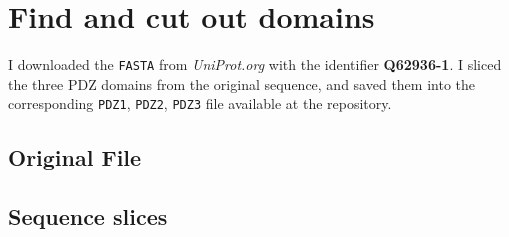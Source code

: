 \chapter{Find and cut out domains}
I downloaded the \texttt{FASTA} from \emph{UniProt.org} with the identifier
\textbf{Q62936-1}. I sliced the three PDZ domains from the original sequence, and saved them into the corresponding \texttt{PDZ1}, \texttt{PDZ2}, \texttt{PDZ3} file available at the repository.

\section{Original File}


\section{Sequence slices}


